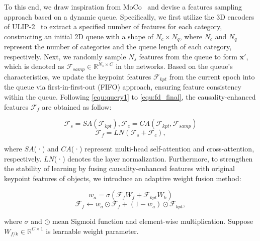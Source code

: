 To this end, we draw inspiration from MoCo~\cite{he2020momentum} and devise a features sampling approach based on a dynamic queue. Specifically, we first utilize the 3D encoders of ULIP-2~\cite{xue2024ulip} to extract a specified number of features for each category, constructing an initial 2D queue with a shape of $N_{c} \times N_{q}$, where $N_{c}$ and $N_{q}$ represent the number of categories and the queue length of each category, respectively.
Next, we randomly sample $N_{s}$ features from the queue to form $\boldsymbol{x'}$, which is denoted as $\mathcal{F}_{samp} \in \mathbb{R}^{N_{s} \times C}$ in the networks. Based on the queue's characteristics, we update the keypoint features $\mathcal{F}_{kpt}$ from the current epoch into the queue via first-in-first-out (FIFO) approach, ensuring feature consistency within the queue.
Following \cref{equ:query1} to \cref{equ:fd_final}, the causality-enhanced features $\mathcal{F}_{f}$ are obtained as follow:
\begin{small} 
\begin{equation}
\label{equ:fd_attn}
    \mathcal{F}_{s} = SA(\mathcal{F}_{kpt}), \mathcal{F}_{c} = CA(\mathcal{F}_{kpt}, \mathcal{F}_{samp})
\end{equation}
\begin{equation}
\label{equ:fd_ln_plus}
    \mathcal{F}_{f} = LN(\mathcal{F}_{s} + \mathcal{F}_{c}),
\end{equation}
\end{small}
where $SA$(·) and $CA$(·) represent multi-head self-attention and cross-attention, respectively. $LN$(·) denotes the layer normalization.
Furthermore, to strengthen the stability of learning by fusing causality-enhanced features with original keypoint features of objects, we introduce an adaptive weight fusion method:
\begin{small} 
\begin{equation}
\label{equ:gate1}
    w_{a} = \sigma(\mathcal{F}_{f}W_{f}+\mathcal{F}_{kpt}W_{k})
\end{equation}
\begin{equation}
\label{equ:gate2}
    \mathcal{F}_{f} \leftarrow w_{a}\odot \mathcal{F}_{f} + (1-w_{a})\odot \mathcal{F}_{kpt},
\end{equation}
\end{small}
where $\sigma$ and $\odot$ mean Sigmoid function and element-wise multiplication. Suppose $W_{f/k} \in \mathbb{R}^{C \times 1}$ is learnable weight parameter.



